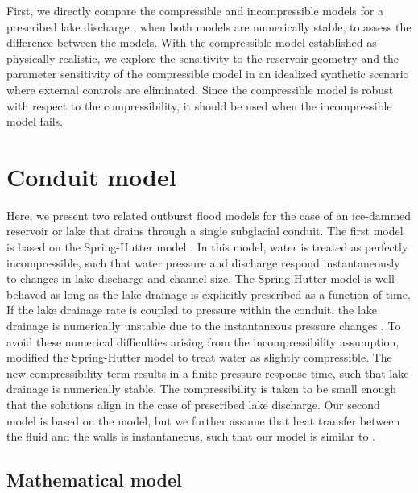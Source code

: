 \documentclass[11pt]{article}
\begin{document}
First, we directly compare the compressible and incompressible models for a prescribed lake discharge \citep[e.g.][]{flowers2004}, when both models are numerically stable, to assess the difference between the models. With the compressible model established as physically realistic, we explore the sensitivity to the reservoir geometry and the parameter sensitivity of the compressible model in an idealized synthetic scenario where external controls are eliminated. Since the compressible model is robust with respect to the compressibility, it should be used when the incompressible model fails.

\section{Conduit model}
Here, we present two related outburst flood models for the case of an ice-dammed reservoir or lake that drains through a single subglacial conduit. The first model is based on the Spring-Hutter model \citep{spring1981, spring1982, clarke1982}. In this model, water is treated as perfectly incompressible, such that water pressure and discharge respond instantaneously to changes in lake discharge and channel size. The Spring-Hutter model is well-behaved as long as the lake drainage is explicitly prescribed as a function of time. If the lake drainage rate is coupled to pressure within the conduit, the lake drainage is numerically unstable due to the instantaneous pressure changes \citep{clarke2003}. To avoid these numerical difficulties arising from the incompressibility assumption, \citet{clarke2003} modified the Spring-Hutter model to treat water as slightly compressible. The new compressibility term results in a finite pressure response time, such that lake drainage is numerically stable. The compressibility is taken to be small enough that the solutions align in the case of prescribed lake discharge. Our second model is based on the \citet{clarke2003} model, but we further assume that heat transfer between the fluid and the walls is instantaneous, such that our model is similar to \citet{flowers2004}.

\subsection{Mathematical model}
\end{document}
